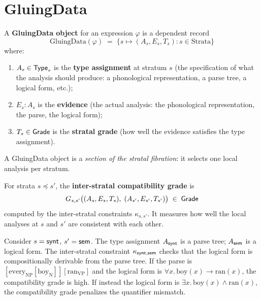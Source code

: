 \section{GluingData}
\label{sec:gluingdata}

\begin{definition}[GluingData]
\label{def:gluingdata}
A \textbf{GluingData object} for an expression $\varphi$ is a
dependent record
\[
  \mathrm{GluingData}(\varphi) \;=\;
  \bigl\{s \mapsto (A_s, E_s, T_s) : s \in \mathrm{Strata}\bigr\}
\]
where:
\begin{enumerate}[label=(\alph*)]
\item $A_s \in \mathsf{Type}_s$ is the \textbf{type assignment} at
  stratum $s$ (the specification of what the analysis should produce:
  a phonological representation, a parse tree, a logical form, etc.);
\item $E_s : A_s$ is the \textbf{evidence} (the actual analysis:
  the phonological representation, the parse, the logical form);
\item $T_s \in \mathsf{Grade}$ is the \textbf{stratal grade} (how well the
  evidence satisfies the type assignment).
\end{enumerate}
A GluingData object is a \emph{section of the stratal fibration}:
it selects one local analysis per stratum.
\end{definition}

\begin{definition}
\label{def:inter-stratal}
For strata $s \preceq s'$, the \textbf{inter-stratal compatibility
grade} is
\[
  G_{s,s'}\bigl((A_s, E_s, T_s),\; (A_{s'}, E_{s'}, T_{s'})\bigr)
  \;\in\; \mathsf{Grade}
\]
computed by the inter-stratal constraints $\kappa_{s,s'}$.  It
measures how well the local analyses at $s$ and $s'$ are consistent
with each other.
\end{definition}

\begin{example}
\label{ex:syn-sem}
Consider $s = \mathsf{synt}$, $s' = \mathsf{sem}$.  The type assignment $A_{\mathsf{synt}}$
is a parse tree; $A_{\mathsf{sem}}$ is a logical form.  The inter-stratal
constraint $\kappa_{\mathsf{synt},\mathsf{sem}}$ checks that the logical form is
compositionally derivable from the parse tree.  If the parse is
$[\text{every}_{\text{NP}} [\text{boy}_{\text{N}}]]
[\text{ran}_{\text{VP}}]$ and the logical form is
$\forall x.\, \mathrm{boy}(x) \to \mathrm{ran}(x)$, the
compatibility grade is high.  If instead the logical form is
$\exists x.\, \mathrm{boy}(x) \wedge \mathrm{ran}(x)$, the
compatibility grade penalizes the quantifier mismatch.
\end{example}

